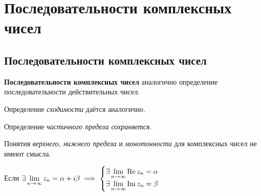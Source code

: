 \section{Последовательности комплексных чисел}

\subsection{Последовательности комплексных чисел}

\textbf{Последовательности комплексных чисел} аналогично определение последовательности
действительных чисел.

Определение \textit{сходимости} даётся аналогично.

Определение \textit{частичного предела сохраняется}.

Понятия \textit{верхнего, нижнего предела} и \textit{монотонности} для комплексных
чисел не имеют смысла.

\begin{theorem}
    Если $\exists \displaystyle\lim_{n \to \infty} z_n = \alpha + i \beta
    \implies \begin{cases}
        \exists \displaystyle\lim_{n \to \infty} \mathrm{Re} \, z_n = \alpha \\
        \exists \displaystyle\lim_{n \to \infty} \mathrm{Im} \, z_n = \beta
    \end{cases}$        
\end{theorem}

